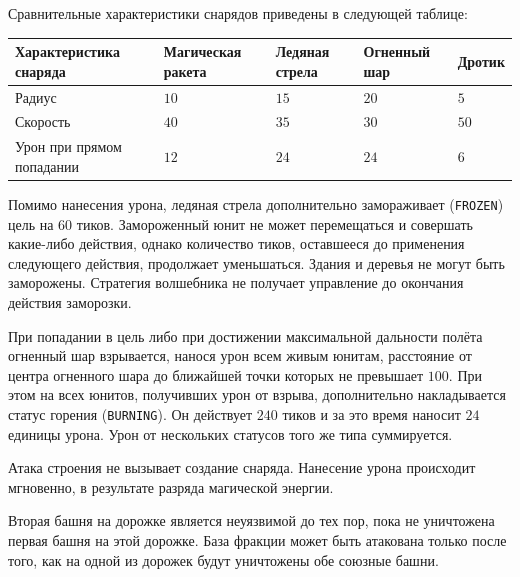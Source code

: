 Сравнительные характеристики снарядов приведены в следующей таблице:

\begin{tabular}{| l | l | l | l | l |}
  \hline
  Характеристика снаряда    & Магическая ракета & Ледяная стрела & Огненный шар          & Дротик \\
  \hline
  Радиус                    & $10$              & $15$           & $20$                  & $5$    \\
  Скорость                  & $40$              & $35$           & $30$                  & $50$   \\
  Урон при прямом попадании & $12$              & $24$           & $24$\footnotemark[11] & $6$    \\
  \hline
\end{tabular}


Помимо нанесения урона, ледяная стрела дополнительно замораживает (\texttt{FROZEN}) цель на $60$ тиков. Замороженный юнит не может
перемещаться и совершать какие-либо действия, однако количество тиков, оставшееся до применения следующего действия, продолжает уменьшаться.
Здания и деревья не могут быть заморожены. Стратегия волшебника не получает управление до окончания действия заморозки.

При попадании в цель либо при достижении максимальной дальности полёта огненный шар взрывается, нанося урон всем живым юнитам, расстояние от
центра огненного шара до ближайшей точки которых не превышает $100$. При этом на всех юнитов, получивших урон от взрыва, дополнительно
накладывается статус горения (\texttt{BURNING}). Он действует $240$ тиков и за это время наносит $24$ единицы урона. Урон от нескольких
статусов того же типа суммируется.

Атака строения не вызывает создание снаряда. Нанесение урона происходит мгновенно, в результате разряда магической энергии.

Вторая башня на дорожке является неуязвимой до тех пор, пока не уничтожена первая башня на этой дорожке. База фракции может быть атакована
только после того, как на одной из дорожек будут уничтожены обе союзные башни.

